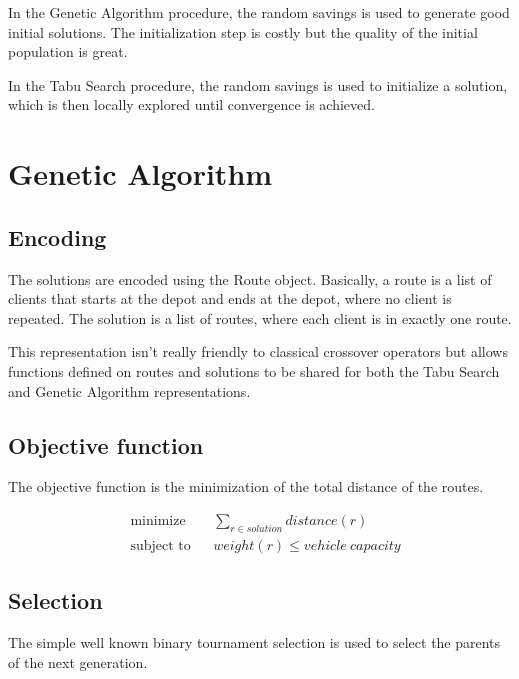\documentclass{article} %
\begin{document}
In the Genetic Algorithm procedure, the random savings is used to generate good initial solutions. The initialization step is costly but the quality of the initial population is great.\newline

In the Tabu Search procedure, the random savings is used to initialize a solution, which is then locally explored until convergence is achieved.


\newpage
\section{Genetic Algorithm}
\label{genetic_algorithm}

\subsection{Encoding}

The solutions are encoded using the Route object. Basically, a route is a list of clients that starts at the depot and ends at the depot, where no client is repeated. The solution is a list of routes, where each client is in exactly one route.

This representation isn't really friendly to classical crossover operators but allows functions defined on routes and solutions to be shared for both the Tabu Search and Genetic Algorithm representations.

\subsection{Objective function}

The objective function is the minimization of the total distance of the routes.

\begin{equation*}
\begin{aligned}
& \text{minimize}
& & \sum\limits_{r \in solution} distance(r) \\
& \text{subject to}
& & weight(r) \leq vehicle\ capacity
\end{aligned}
\end{equation*}

\subsection{Selection}

The simple well known binary tournament selection is used to select the parents of the next generation.
\end{document}
